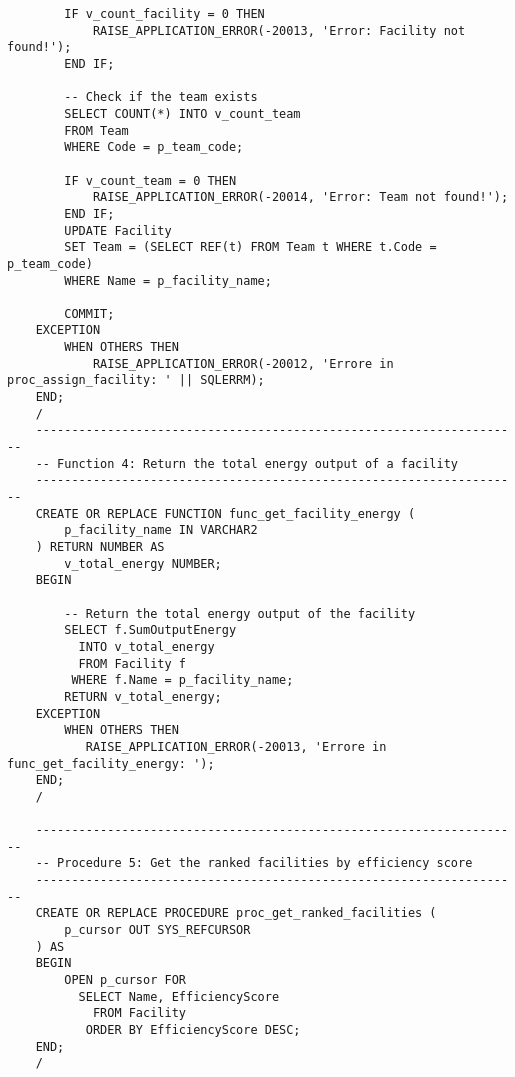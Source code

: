 \begin{lstlisting}
        IF v_count_facility = 0 THEN
            RAISE_APPLICATION_ERROR(-20013, 'Error: Facility not found!');
        END IF;
    
        -- Check if the team exists
        SELECT COUNT(*) INTO v_count_team
        FROM Team
        WHERE Code = p_team_code;
    
        IF v_count_team = 0 THEN
            RAISE_APPLICATION_ERROR(-20014, 'Error: Team not found!');
        END IF;
        UPDATE Facility
        SET Team = (SELECT REF(t) FROM Team t WHERE t.Code = p_team_code)
        WHERE Name = p_facility_name;
    
        COMMIT;
    EXCEPTION
        WHEN OTHERS THEN
            RAISE_APPLICATION_ERROR(-20012, 'Errore in proc_assign_facility: ' || SQLERRM);
    END;
    /
    --------------------------------------------------------------------
    -- Function 4: Return the total energy output of a facility
    --------------------------------------------------------------------
    CREATE OR REPLACE FUNCTION func_get_facility_energy (
        p_facility_name IN VARCHAR2
    ) RETURN NUMBER AS
        v_total_energy NUMBER;
    BEGIN
         
        -- Return the total energy output of the facility
        SELECT f.SumOutputEnergy
          INTO v_total_energy
          FROM Facility f
         WHERE f.Name = p_facility_name;
        RETURN v_total_energy;
    EXCEPTION
        WHEN OTHERS THEN
           RAISE_APPLICATION_ERROR(-20013, 'Errore in func_get_facility_energy: ');
    END;
    /
    
    --------------------------------------------------------------------
    -- Procedure 5: Get the ranked facilities by efficiency score
    --------------------------------------------------------------------
    CREATE OR REPLACE PROCEDURE proc_get_ranked_facilities (
        p_cursor OUT SYS_REFCURSOR
    ) AS
    BEGIN
        OPEN p_cursor FOR
          SELECT Name, EfficiencyScore
            FROM Facility
           ORDER BY EfficiencyScore DESC;
    END;
    /
\end{lstlisting}